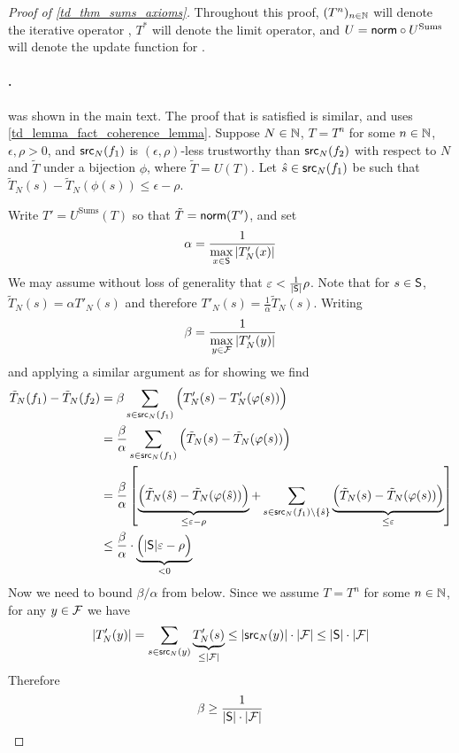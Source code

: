 \begin{proof}[Proof of \cref{td_thm_sums_axioms}]

Throughout this proof, $(T^n)_{n \in \Nat}$ will denote the iterative operator
\sums{}, $T^*$ will denote the limit operator, and $U = \norm \circ
U^{\text{Sums}}$ will denote the update function for \sums{}.

    \paragraph{\coherence{}.} \sourcecoherence{} was shown in the main text.
    The proof that \factcoherence{} is satisfied is similar, and uses
\cref{td_lemma_fact_coherence_lemma}. Suppose $N \in \N$, $T = T^n$ for some $n
\in \Nat$, $\epsilon, \rho > 0$, and $\src_N(f_1)$ is $(\epsilon, \rho)$-less
trustworthy than $\src_N(f_2)$ with respect to $N$ and $\tilde{T}$ under a
bijection $\phi$, where $\tilde{T} = U(T)$. Let $\hat{s} \in \src_N(f_1)$ be
such that $\tilde{T}_N(s) - \tilde{T}_N(\phi(s)) \le \epsilon - \rho$.

Write $T' = U^{\text{Sums}}(T)$ so that $\tilde{T} = \norm(T')$, and set
\[
    \alpha = \frac{1}{\max\limits_{x \in \S}{|T'_N(x)|}}
\]
We may assume without loss of generality that $\epsilon < \frac{1}{|\S|}\rho$.
Note that for $s \in \S$, $\tilde{T}_N(s) = {\alpha}T'_N(s)$ and therefore
$T'_N(s) = \frac{1}{\alpha}\tilde{T}_N(s)$. Writing
\[
    \beta = \frac{1}{\max\limits_{y \in \F}{|T'_N(y)|}}
\]
    and applying a similar argument as for showing \sourcecoherence{} we find
\begin{align*}
    \tilde{T}_N(f_1) - \tilde{T}_N(f_2)
    &= \beta \sum_{s \in \src_N(f_1)}{ \Big(
        T'_N(s) - T'_N(\phi(s))
    \Big) } \\
    &= \frac{\beta}{\alpha} \sum_{s \in \src_N(f_1)}{ \Big(
        \tilde{T}_N(s) - \tilde{T}_N(\phi(s))
    \Big) } \\
    &= \frac{\beta}{\alpha} \left[
        \underbrace{
            \Big(
                \tilde{T}_N(\hat{s}) - \tilde{T}_N(\phi(\hat{s}))
            \Big)
        }_{\le \epsilon - \rho}
        +
        \sum_{s \in \src_N(f_1) \setminus \{\hat{s}\} }{
            \underbrace{
                \Big(
                    \tilde{T}_N(s) - \tilde{T}_N(\phi(s))
                \Big)
            }_{\le \epsilon}
        }
    \right] \\
    & \le \frac{\beta}{\alpha}
      \cdot
      \underbrace{
          \Big(|\S|\epsilon - \rho \Big)
      }_{< 0}
\end{align*}
Now we need to bound $\beta / \alpha$ from below. Since we assume $T =
T^n$ for some $n \in \Nat$, for any $y \in \F$ we have
\[
    |T'_N(y)| =
        \sum_{s \in \src_N(y)}{
            \underbrace{T'_N(s)}_{\le |\F|}
        }
    \le |\src_N(y)| \cdot |\F|
    \le |\S| \cdot |\F|
\]
Therefore
\[
    \beta \ge \frac{1}{|\S| \cdot |\F|}
\]


\end{proof}
